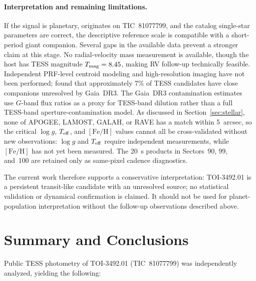 \documentclass[11pt]{article}
\begin{document}
\paragraph{Interpretation and remaining limitations.}
If the signal is planetary, originates on TIC~81077799, and the catalog
single-star parameters are correct, the descriptive reference scale is
compatible with a short-period giant companion.  Several gaps in the available data prevent a stronger
claim at this stage.  No radial-velocity mass measurement is available,
though the host has TESS magnitude $T_{\rm mag}=8.45$, making RV follow-up
technically feasible.  Independent PRF-level centroid modeling and
high-resolution imaging have not been performed; \citet{LilloBox2024}
found that approximately 7\% of TESS candidates have close companions
unresolved by Gaia~DR3.  The Gaia~DR3 contamination estimates use
$G$-band flux ratios as a proxy for TESS-band dilution rather than a
full TESS-band aperture-contamination model.  As discussed in
Section~\ref{sec:stellar}, none of APOGEE, LAMOST, GALAH, or RAVE has a
match within 5~arcsec, so the critical $\log g$, $T_{\rm eff}$, and
$[\mathrm{Fe}/\mathrm{H}]$ values cannot all be cross-validated without new
observations: $\log g$ and $T_{\rm eff}$ require independent measurements,
while $[\mathrm{Fe}/\mathrm{H}]$ has not yet been measured.  The 20~s products
in Sectors~90, 99, and~100 are retained only as same-pixel cadence diagnostics.

The current work therefore supports a conservative interpretation:
TOI-3492.01 is a persistent transit-like candidate with an unresolved source;
no statistical validation or dynamical confirmation is claimed.  It
should not be used for planet-population interpretation without the
follow-up observations described above.

\section{Summary and Conclusions}

Public TESS photometry of TOI-3492.01 (TIC~81077799) was independently
analyzed, yielding the following:
\end{document}
